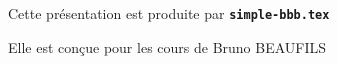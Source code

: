   \item Cette présentation est produite par \texttt{\textbf{simple-bbb.tex}}
  \item Elle est conçue pour les cours de Bruno BEAUFILS
